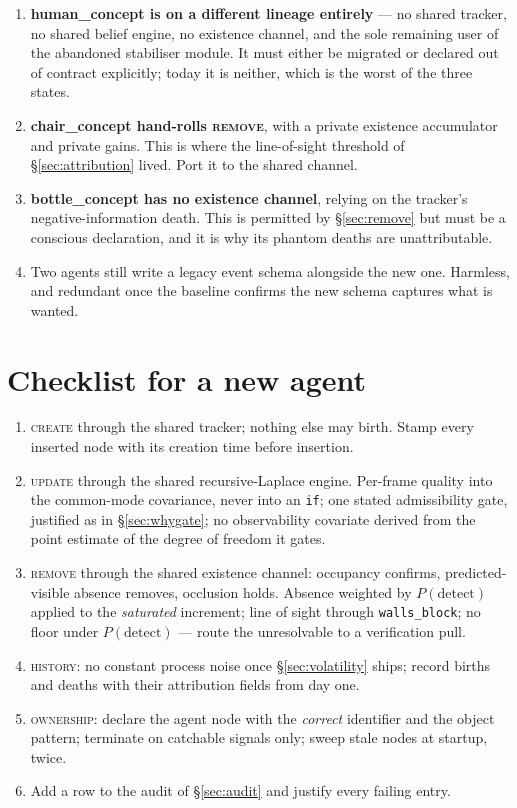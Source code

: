 \documentclass[11pt,a4paper]{report}
\newcommand{\stage}[1]{\textsc{#1}}
\newcommand{\Create}{\stage{create}}
\newcommand{\Update}{\stage{update}}
\newcommand{\Remove}{\stage{remove}}
\newcommand{\History}{\stage{history}}
\newcommand{\Ownership}{\stage{ownership}}
\begin{document}
\begin{enumerate}[leftmargin=1.6em,itemsep=3pt]
\item \textbf{\textsf{human\_concept} is on a different lineage entirely} --- no shared tracker, no
      shared belief engine, no existence channel, and the sole remaining user of the abandoned
      stabiliser module. It must either be migrated or declared out of contract explicitly; today it
      is neither, which is the worst of the three states.
\item \textbf{\textsf{chair\_concept} hand-rolls \Remove}, with a private existence accumulator and
      private gains. This is where the line-of-sight threshold of \S\ref{sec:attribution} lived. Port
      it to the shared channel.
\item \textbf{\textsf{bottle\_concept} has no existence channel}, relying on the tracker's
      negative-information death. This is permitted by \S\ref{sec:remove} but must be a conscious
      declaration, and it is why its phantom deaths are unattributable.
\item Two agents still write a legacy event schema alongside the new one. Harmless, and redundant
      once the baseline confirms the new schema captures what is wanted.
\end{enumerate}

\section{Checklist for a new agent}
\label{sec:checklist}

\begin{enumerate}[leftmargin=1.6em,itemsep=3pt]
\item \Create{} through the shared tracker; nothing else may birth. Stamp every inserted node with
      its creation time before insertion.
\item \Update{} through the shared recursive-Laplace engine. Per-frame quality into the common-mode
      covariance, never into an \texttt{if}; one stated admissibility gate, justified as in
      \S\ref{sec:whygate}; no observability covariate derived from the point estimate of the degree
      of freedom it gates.
\item \Remove{} through the shared existence channel: occupancy confirms, predicted-visible absence
      removes, occlusion holds. Absence weighted by $P(\text{detect})$ applied to the
      \emph{saturated} increment; line of sight through \texttt{walls\_block}; no floor under
      $P(\text{detect})$ --- route the unresolvable to a verification pull.
\item \History: no constant process noise once \S\ref{sec:volatility} ships; record births and
      deaths with their attribution fields from day one.
\item \Ownership: declare the agent node with the \emph{correct} identifier and the object pattern;
      terminate on catchable signals only; sweep stale nodes at startup, twice.
\item Add a row to the audit of \S\ref{sec:audit} and justify every failing entry.
\end{enumerate}
\end{document}
